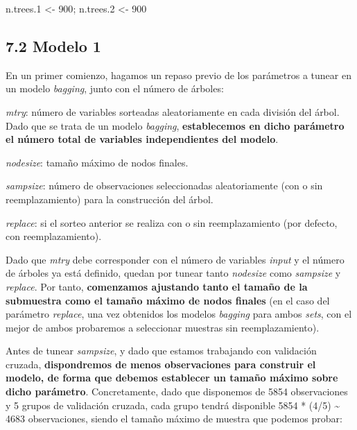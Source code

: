 \documentclass[
]{article}
\newenvironment{Shaded}{\begin{snugshade}}{\end{snugshade}}
\newcommand{\DecValTok}[1]{\textcolor[rgb]{0.00,0.00,0.81}{#1}}
\newcommand{\FloatTok}[1]{\textcolor[rgb]{0.00,0.00,0.81}{#1}}
\newcommand{\NormalTok}[1]{#1}
\newcommand{\StringTok}[1]{\textcolor[rgb]{0.31,0.60,0.02}{#1}}
\begin{document}
\begin{Shaded}
\begin{Highlighting}[]
\NormalTok{n.trees}\FloatTok{.1}\NormalTok{ <{-}}\StringTok{ }\DecValTok{900}\NormalTok{; n.trees}\FloatTok{.2}\NormalTok{ <{-}}\StringTok{ }\DecValTok{900}
\end{Highlighting}
\end{Shaded}

\hypertarget{modelo-1}{%
\subsection{7.2 Modelo 1}\label{modelo-1}}

En un primer comienzo, hagamos un repaso previo de los parámetros a
tunear en un modelo \emph{bagging}, junto con el número de árboles:

\emph{mtry}: número de variables sorteadas aleatoriamente en cada
división del árbol. Dado que se trata de un modelo \emph{bagging},
\textbf{establecemos en dicho parámetro el número total de variables
independientes del modelo}.

\emph{nodesize}: tamaño máximo de nodos finales.

\emph{sampsize}: número de observaciones seleccionadas aleatoriamente
(con o sin reemplazamiento) para la construcción del árbol.

\emph{replace}: si el sorteo anterior se realiza con o sin
reemplazamiento (por defecto, con reemplazamiento).

Dado que \emph{mtry} debe corresponder con el número de variables
\emph{input} y el número de árboles ya está definido, quedan por tunear
tanto \emph{nodesize} como \emph{sampsize} y \emph{replace}. Por tanto,
\textbf{comenzamos ajustando tanto el tamaño de la submuestra como el
tamaño máximo de nodos finales} (en el caso del parámetro
\emph{replace}, una vez obtenidos los modelos \emph{bagging} para ambos
\emph{sets}, con el mejor de ambos probaremos a seleccionar muestras sin
reemplazamiento).

Antes de tunear \emph{sampsize}, y dado que estamos trabajando con
validación cruzada, \textbf{dispondremos de menos observaciones para
construir el modelo, de forma que debemos establecer un tamaño máximo
sobre dicho parámetro}. Concretamente, dado que disponemos de 5854
observaciones y 5 grupos de validación cruzada, cada grupo tendrá
disponible 5854 * (4/5) \textasciitilde{} 4683 observaciones, siendo el
tamaño máximo de muestra que podemos probar:
\end{document}
